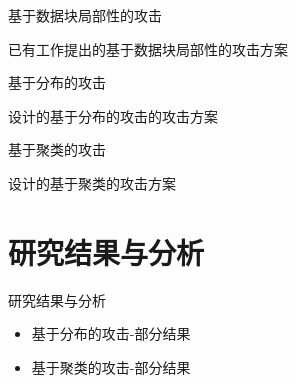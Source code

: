 \documentclass[aspectratio=43]{beamer}
\begin{document}
\begin{frame}{基于数据块局部性的攻击}
\centering
{}
\begin{card}
已有工作提出的基于数据块局部性的攻击方案
\end{card}   
\end{frame}

\begin{frame}{基于分布的攻击}
\centering
{}
\begin{card}
设计的基于分布的攻击的攻击方案
\end{card}   
\end{frame}

\begin{frame}{基于聚类的攻击}
\centering
{}
\begin{card}
设计的基于聚类的攻击方案
\end{card}   
\end{frame}

\section{研究结果与分析}

\begin{frame}{研究结果与分析}
\begin{card}
\begin{itemize}
    \item 基于分布的攻击-部分结果
    \item 基于聚类的攻击-部分结果
\end{itemize}
\end{card}
\end{frame}
\end{document}
